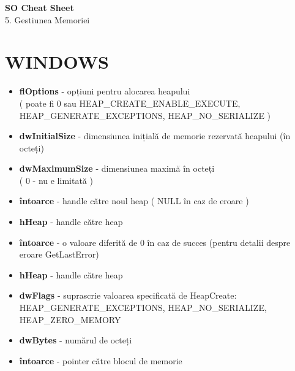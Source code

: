 \documentclass{refcard.cs.pub.ro}
\begin{document}
\raggedright
\footnotesize
\begin{multicols*}{3}

\setlength{\columnseprule}{0.25pt}
\setlength{\premulticols}{1pt}
\setlength{\postmulticols}{1pt}
\setlength{\multicolsep}{1pt}
\setlength{\columnsep}{2pt}

\begin{center}
     \Large{\textbf{SO Cheat Sheet}} \\
      {5. Gestiunea Memoriei}\\
\end{center}

\vspace*{0.3cm}
\section{WINDOWS}

\begin{itemize}
  \item \textbf{flOptions} - opțiuni pentru alocarea heapului \\ ( poate fi 0 sau
HEAP_CREATE_ENABLE_EXECUTE, HEAP_GENERATE_EXCEPTIONS, HEAP_NO_SERIALIZE )
  \item \textbf{dwInitialSize} - dimensiunea inițială de memorie rezervată heapului (în octeți)
  \item \textbf{dwMaximumSize} - dimensiunea maximă în octeți \\ ( 0 - nu e limitată )
  \item \textbf{întoarce} - handle către noul heap ( NULL în caz de eroare )
\end{itemize}

\begin{itemize}
  \item \textbf{hHeap} - handle către heap
  \item \textbf{întoarce} - o valoare diferită de 0 în caz de succes (pentru detalii despre eroare GetLastError)
\end{itemize}

\begin{itemize}
  \item \textbf{hHeap} - handle către heap
  \item \textbf{dwFlags} - suprascrie valoarea specificată de HeapCreate: 
HEAP_GENERATE_EXCEPTIONS, HEAP_NO_SERIALIZE, HEAP_ZERO_MEMORY
  \item \textbf{dwBytes} - numărul de octeți
  \item \textbf{întoarce} - pointer către blocul de memorie
\end{itemize}


\end{multicols*}
\end{document}
